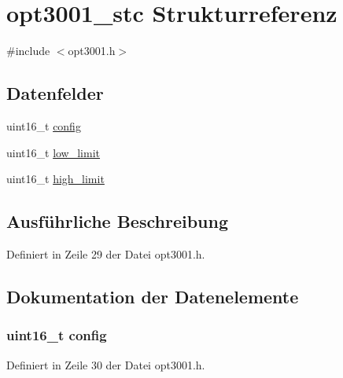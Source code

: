 \hypertarget{structopt3001__stc}{}\section{opt3001\+\_\+stc Strukturreferenz}
\label{structopt3001__stc}


{\ttfamily \#include $<$opt3001.\+h$>$}

\subsection*{Datenfelder}
\begin{DoxyCompactItemize}
\item 
uint16\+\_\+t \hyperlink{structopt3001__stc_aa26297bc57b4b74262246d02175f4308}{config}
\item 
uint16\+\_\+t \hyperlink{structopt3001__stc_a5561e4eedc9af4ceb86ed5056241bf77}{low\+\_\+limit}
\item 
uint16\+\_\+t \hyperlink{structopt3001__stc_af121d4246e275920873b33ad155fa9ba}{high\+\_\+limit}
\end{DoxyCompactItemize}


\subsection{Ausführliche Beschreibung}


Definiert in Zeile 29 der Datei opt3001.\+h.



\subsection{Dokumentation der Datenelemente}
\hypertarget{structopt3001__stc_aa26297bc57b4b74262246d02175f4308}{}
\subsubsection[{config}]{\setlength{\rightskip}{0pt plus 5cm}uint16\+\_\+t config}\label{structopt3001__stc_aa26297bc57b4b74262246d02175f4308}


Definiert in Zeile 30 der Datei opt3001.\+h.

\hypertarget{structopt3001__stc_af121d4246e275920873b33ad155fa9ba}{}
